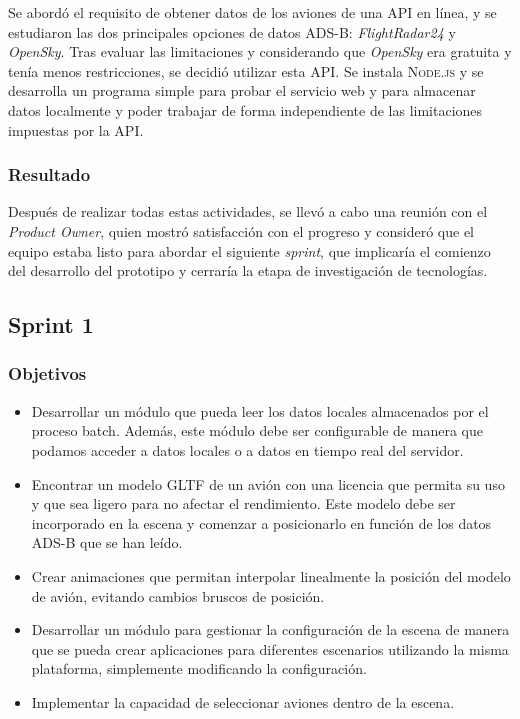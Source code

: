 \documentclass[a4paper, 11pt]{book}
\begin{document}
Se abordó el requisito de obtener datos de los aviones de una \textsc{API} en línea, y se estudiaron las dos principales opciones de datos \textsc{ADS-B}: \emph{FlightRadar24} y \emph{OpenSky}. Tras evaluar las limitaciones y considerando que \emph{OpenSky} era gratuita y tenía menos restricciones, se decidió utilizar esta \textsc{API}.
Se instala \textsc{Node.js} y se desarrolla un programa simple para probar el servicio web y para almacenar datos localmente y poder trabajar de forma independiente de las limitaciones impuestas por la \textsc{API}.
\subsubsection{Resultado}
Después de realizar todas estas actividades, se llevó a cabo una reunión con el \emph{Product Owner}, quien mostró satisfacción con el progreso y consideró que el equipo estaba listo para abordar el siguiente \emph{sprint}, que implicaría el comienzo del desarrollo del prototipo y cerraría la etapa de investigación de tecnologías.
\subsection{Sprint 1}
\subsubsection{Objetivos}
\begin{itemize}
    \item Desarrollar un módulo que pueda leer los datos locales almacenados por el proceso batch. Además, este módulo debe ser configurable de manera que podamos acceder a datos locales o a datos en tiempo real del servidor.
    \item Encontrar un modelo \textsc{GLTF} de un avión con una licencia que permita su uso y que sea ligero para no afectar el rendimiento. Este modelo debe ser incorporado en la escena y comenzar a posicionarlo en función de los datos \textsc{ADS-B} que se han leído.
    \item Crear animaciones que permitan interpolar linealmente la posición del modelo de avión, evitando cambios bruscos de posición.
    \item Desarrollar un módulo para gestionar la configuración de la escena de manera que se pueda crear aplicaciones para diferentes escenarios utilizando la misma plataforma, simplemente modificando la configuración.
    \item Implementar la capacidad de seleccionar aviones dentro de la escena.
\end{itemize}
\end{document}
